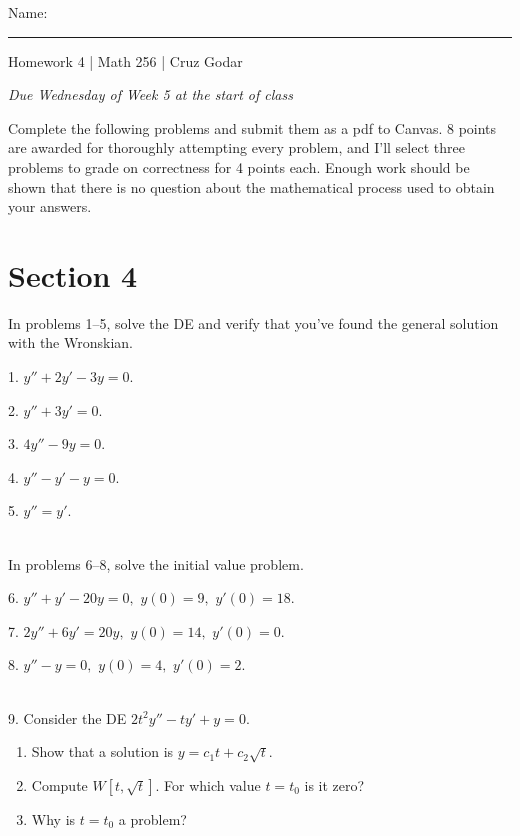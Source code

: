 \documentclass{article}
\begin{document}
\Large Name: \rule{2in}{0.15mm} \hfill Homework 4 | Math 256 | Cruz Godar \vspace{4pt}  \normalsize

\textit{Due Wednesday of Week 5 at the start of class}

Complete the following problems and submit them as a pdf to Canvas. 8 points are awarded for thoroughly attempting every problem, and I'll select three problems to grade on correctness for 4 points each. Enough work should be shown that there is no question about the mathematical process used to obtain your answers.

\section{Section 4}

In problems 1--5, solve the DE and verify that you've found the general solution with the Wronskian.

1. $\displaystyle y'' + 2y' - 3y = 0.$

2. $\displaystyle y'' + 3y' = 0.$

3. $\displaystyle 4y'' - 9y = 0.$

4. $\displaystyle y'' - y' - y = 0.$

5. $\displaystyle y'' = y'.$

~\\

In problems 6--8, solve the initial value problem.

6. $\displaystyle y'' + y' - 20y = 0,$ $\displaystyle y(0) = 9,$ $\displaystyle y'(0) = 18.$

7. $\displaystyle 2y'' + 6y' = 20y,$ $\displaystyle y(0) = 14,$ $\displaystyle y'(0) = 0.$

8. $\displaystyle y'' - y = 0,$ $\displaystyle y(0) = 4,$ $\displaystyle y'(0) = 2.$

~\\

9. Consider the DE $\displaystyle 2t^2y'' - ty' + y = 0.$

\begin{enumerate}

	\item Show that a solution is $\displaystyle y = c_1t + c_2\sqrt{t}.$

	\item Compute $\displaystyle W\left[t, \sqrt{t}\right].$ For which value $t = t_0$ is it zero?

	\item Why is $t = t_0$ a problem?

\end{enumerate}
\end{document}

